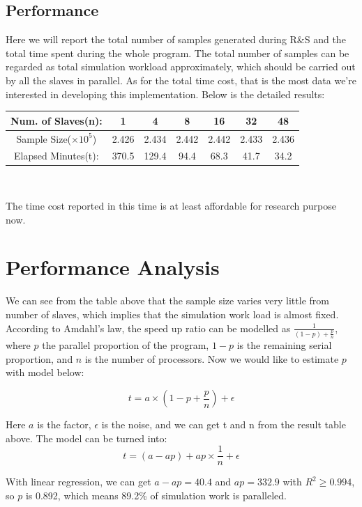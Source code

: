 \documentclass[12pt,a4]{report}
\begin{document}
\subsection{Performance}

Here we will report the total number of samples generated during R\&S and the total time spent during the whole program. The total number of samples can be regarded as total simulation workload approximately, which should be carried out by all the slaves in parallel. As for the total time cost, that is the most data we're interested in developing this implementation. Below is the detailed results:

\begin{center}
\begin{tabular}{|c|c|c|c|c|c|c|}
\hline
Num. of Slaves(n): & 1 & 4 & 8 & 16 & 32 & 48 \\
\hline
Sample Size($\times 10^5$) & 2.426 & 2.434 & 2.442 & 2.442 & 2.433 & 2.436\\
\hline
Elapsed Minutes(t): & 370.5 & 129.4 & 94.4 & 68.3 & 41.7 & 34.2 \\
\hline
\end{tabular} \\
\end{center}

The time cost reported in this time is at least affordable for research purpose now.

\section{Performance Analysis}

We can see from the table above that the sample size varies very little from number of slaves, which implies that the simulation work load is almost fixed. According to Amdahl's law, the speed up ratio can be modelled as $\frac{1}{(1 - p) + \frac{p}{n}}$, where $p$ the parallel proportion of the program, $1 - p$ is the remaining serial proportion, and $n$ is the number of processors. Now we would like to estimate $p$ with model below:

$$ t = a \times (1 - p + \frac{p}{n}) + \epsilon $$

Here $a$ is the factor, $\epsilon$ is the noise, and we can get t and n from the result table above. The model can be turned into: 
$$ t = (a - ap) + ap \times \frac{1}{n} + \epsilon $$

With linear regression, we can get $a - ap = 40.4$ and $ap = 332.9$ with $R^2 \geqslant 0.994$, so $p$ is 0.892, which means 89.2\% of simulation work is paralleled.
\end{document}
